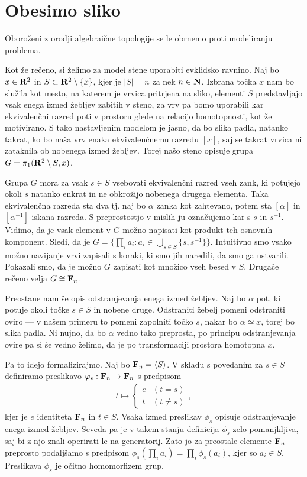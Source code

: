 \documentclass[11pt, a4paper]{article}
\begin{document}
\section{Obesimo sliko}


Oboroženi z orodji algebraične topologije se le obrnemo proti modeliranju problema.

\begin{zgled}
    Kot že rečeno, si želimo za model stene uporabiti evklidsko ravnino. Naj bo $x \in \mathbf{R}^2$ in $S \subset \mathbf{R}^2 \setminus \{x\}$, kjer je $|S| = n$ za nek $n \in \mathbf{N}$. Izbrana točka $x$ nam bo služila kot mesto, na katerem je vrvica pritrjena na sliko, elementi $S$ predstavljajo vsak enega izmed žebljev zabitih v steno, za vrv pa bomo uporabili kar ekvivalenčni razred poti v prostoru glede na relacijo homotopnosti, kot že motivirano. S tako nastavljenim modelom je jasno, da bo slika padla, natanko takrat, ko bo naša vrv enaka ekvivalenčnemu razredu $[x]$, saj se takrat vrvica ni zataknila ob nobenega izmed žebljev. Torej našo steno opisuje grupa $G = \pi_1(\mathbf{R}^2 \setminus S, x)$.

    Grupa $G$ mora za vsak $s \in S$ vsebovati ekvivalenčni razred vseh zank, ki potujejo okoli $s$ natanko enkrat in ne obkrožijo nobenega drugega elementa. Taka ekvivalenčna razreda sta dva tj. naj bo $\alpha$ zanka kot zahtevano, potem sta $[\alpha]$ in $[\alpha^{-1}]$ iskana razreda. S preprostostjo v mislih ju označujemo kar s $s$ in $s^{-1}$. Vidimo, da je vsak element v $G$ možno napisati kot produkt teh osnovnih komponent. Sledi, da je $G = \{\prod_i a_i : a_i \in \bigcup_{s \in S} \{s, s^{-1} \} \}$. Intuitivno smo vsako možno navijanje vrvi zapisali s koraki, ki smo jih naredili, da smo ga ustvarili. Pokazali smo, da je možno $G$ zapisati kot množico vseh besed v $S$. Drugače rečeno velja $G \cong \mathbf{F}_n$.

    Preostane nam še opis odstranjevanja enega izmed žebljev. Naj bo $\alpha$ pot, ki potuje okoli točke $s \in S$ in nobene druge. Odstraniti žebelj pomeni odstraniti oviro — v našem primeru to pomeni zapolniti točko $s$, nakar bo $\alpha \simeq x$, torej bo slika padla. Ni nujno, da bo $\alpha$ vedno tako preprosta, po principu odstranjevanja ovire pa si še vedno želimo, da je po transformaciji prostora homotopna $x$.

    Pa to idejo formalizirajmo. Naj bo $\mathbf{F}_n = \langle S \rangle$. V skladu s povedanim za $s \in S$ definiramo preslikavo $\varphi_s : \mathbf{F}_n \to \mathbf{F}_n$ s predpisom
    \begin{align*}
        t \mapsto
        \begin{cases}
            e & (t = s) \\
            t & (t \neq s)
        \end{cases},
    \end{align*}
    kjer je $e$ identiteta $\mathbf{F}_n$ in $t \in S$. Vsaka izmed preslikav $\phi_s$ opisuje odstranjevanje enega izmed žebljev. Seveda pa je v takem stanju definicija $\phi_s$ zelo pomanjkljiva, saj bi z njo znali operirati le na generatorij. Zato jo za preostale elemente $\mathbf{F}_n$ preprosto podaljšamo s predpisom $\phi_s(\prod_i a_i) = \prod_i \phi_s(a_i)$, kjer so $a_i \in S$. Preslikava $\phi_s$ je očitno homomorfizem grup.


\end{zgled}
\end{document}
